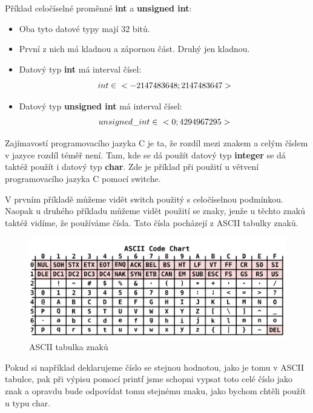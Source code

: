 \documentclass[twoside,a4paper]{article} %
\begin{document}
Příklad celočíselné proměnné \textbf{int} a \textbf{unsigned int}:
\begin{itemize}
    \item Oba tyto datové typy mají 32 bitů.
    \item První z nich má kladnou a zápornou část. Druhý jen kladnou.
    \item Datový typ \textbf{int} má interval čísel:
    \begin{equation}
        int \in \hspace{6px} <-2147483648;2147483647>  
    \end{equation}
    \item Datový typ \textbf{unsigned int} má interval čísel:
    \begin{equation}
        unsigned\_int \in \hspace{6px} <0;4294967295>
    \end{equation}
\end{itemize}

Zajímavostí programovacího jazyka C je ta, že rozdíl mezi znakem a celým číslem v jazyce rozdíl téměř není. Tam, kde se dá použít datový typ \textbf{integer} se dá taktéž použít i datový typ \textbf{char}. Zde je příklad při použití u větvení programovacího jazyka C pomocí switche.




V prvním příkladě můžeme vidět switch použitý s celočíselnou podmínkou. Naopak u druhého příkladu můžeme vidět použití se znaky, jenže u těchto znaků taktéž vidíme, že používáme čísla. Tato čísla pocházejí z ASCII tabulky znaků.

\begin{figure}[H]
    \centering
    \includegraphics[width=0.7\linewidth]{images/ASCII.png}
    \caption{ASCII tabulka znaků}
    \label{fig:asciiTable}
\end{figure}

Pokud si například deklarujeme číslo se stejnou hodnotou, jako je tomu v ASCII tabulce, pak při výpisu pomocí printf jsme schopni vypsat toto celé číslo jako znak a opravdu bude odpovídat tomu stejnému znaku, jako bychom chtěli použít u typu char.
\end{document}
